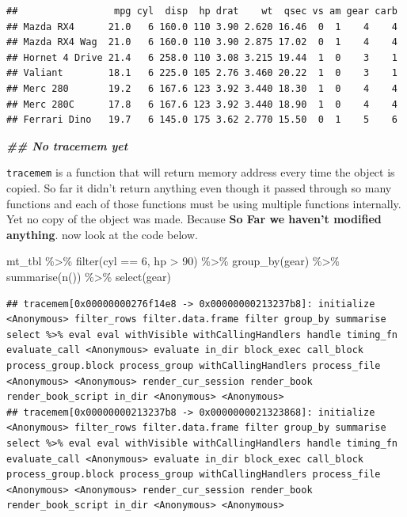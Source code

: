 \documentclass[
]{book}
\newenvironment{Shaded}{\begin{snugshade}}{\end{snugshade}}
\newcommand{\DecValTok}[1]{\textcolor[rgb]{0.00,0.00,0.81}{#1}}
\newcommand{\DocumentationTok}[1]{\textcolor[rgb]{0.56,0.35,0.01}{\textbf{\textit{#1}}}}
\newcommand{\FunctionTok}[1]{\textcolor[rgb]{0.00,0.00,0.00}{#1}}
\newcommand{\NormalTok}[1]{#1}
\newcommand{\SpecialCharTok}[1]{\textcolor[rgb]{0.00,0.00,0.00}{#1}}
\begin{document}
\begin{verbatim}
##                 mpg cyl  disp  hp drat    wt  qsec vs am gear carb
## Mazda RX4      21.0   6 160.0 110 3.90 2.620 16.46  0  1    4    4
## Mazda RX4 Wag  21.0   6 160.0 110 3.90 2.875 17.02  0  1    4    4
## Hornet 4 Drive 21.4   6 258.0 110 3.08 3.215 19.44  1  0    3    1
## Valiant        18.1   6 225.0 105 2.76 3.460 20.22  1  0    3    1
## Merc 280       19.2   6 167.6 123 3.92 3.440 18.30  1  0    4    4
## Merc 280C      17.8   6 167.6 123 3.92 3.440 18.90  1  0    4    4
## Ferrari Dino   19.7   6 145.0 175 3.62 2.770 15.50  0  1    5    6
\end{verbatim}

\begin{Shaded}
\begin{Highlighting}[]
\DocumentationTok{\#\# No tracemem yet}
\end{Highlighting}
\end{Shaded}

\texttt{tracemem} is a function that will return memory address every time the object is copied. So far it didn't return anything even though it passed through so many functions and each of those functions must be using multiple functions internally. Yet no copy of the object was made. Because \textbf{So Far we haven't modified anything}. now look at the code below.

\begin{Shaded}
\begin{Highlighting}[]
\NormalTok{mt\_tbl }\SpecialCharTok{\%\textgreater{}\%}
  \FunctionTok{filter}\NormalTok{(cyl }\SpecialCharTok{==} \DecValTok{6}\NormalTok{,}
\NormalTok{         hp }\SpecialCharTok{\textgreater{}} \DecValTok{90}\NormalTok{) }\SpecialCharTok{\%\textgreater{}\%}
  \FunctionTok{group\_by}\NormalTok{(gear) }\SpecialCharTok{\%\textgreater{}\%}
  \FunctionTok{summarise}\NormalTok{(}\FunctionTok{n}\NormalTok{()) }\SpecialCharTok{\%\textgreater{}\%}
  \FunctionTok{select}\NormalTok{(gear)}
\end{Highlighting}
\end{Shaded}

\begin{verbatim}
## tracemem[0x00000000276f14e8 -> 0x00000000213237b8]: initialize <Anonymous> filter_rows filter.data.frame filter group_by summarise select %>% eval eval withVisible withCallingHandlers handle timing_fn evaluate_call <Anonymous> evaluate in_dir block_exec call_block process_group.block process_group withCallingHandlers process_file <Anonymous> <Anonymous> render_cur_session render_book render_book_script in_dir <Anonymous> <Anonymous> 
## tracemem[0x00000000213237b8 -> 0x0000000021323868]: initialize <Anonymous> filter_rows filter.data.frame filter group_by summarise select %>% eval eval withVisible withCallingHandlers handle timing_fn evaluate_call <Anonymous> evaluate in_dir block_exec call_block process_group.block process_group withCallingHandlers process_file <Anonymous> <Anonymous> render_cur_session render_book render_book_script in_dir <Anonymous> <Anonymous>
\end{verbatim}
\end{document}
